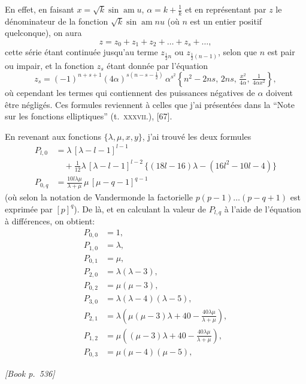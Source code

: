 \documentclass[11pt]{article}
\begin{document}
\noindent En effet, en faisant $x = \sqrt{k}\sin\operatorname{am} u$, $\alpha = k + \tfrac{1}{k}$ et en repr\'esentant par $z$ le d\'enominateur de la fonction $\sqrt{k}\sin\operatorname{am} nu$ (o\`u $n$ est un entier positif quelconque), on aura
\[
z = z_{0} + z_{1} + z_{2} + \dots + z_{s} + \dots ,
\]
cette s\'erie \'etant continu\'ee jusqu'au terme $z_{\frac{1}{2}n}$ ou $z_{\frac{1}{2}(n-1)}$, selon que $n$ est pair ou impair, et la fonction $z_{s}$ \'etant donn\'ee par l'\'equation
\[
z_{s} = (-1)^{n+s+1}(4\alpha)^{s(n-s-\frac{1}{2})}\,\alpha^{s^{2}}\left\{n^{2} - 2ns,\,2ns,\,\tfrac{x^{2}}{4\alpha},\,\tfrac{1}{4\alpha x^{2}}\right\},
\]
o\`u cependant les termes qui contiennent des puissances n\'egatives de $\alpha$ doivent \^etre n\'eglig\'es. Ces formules reviennent \`a celles que j'ai pr\'esent\'ees dans la ``Note sur les fonctions elliptiques'' (t.~\textsc{xxxvii}.), [67].

En revenant aux fonctions $\{\lambda,\mu,x,y\}$, j'ai trouv\'e les deux formules
\[
\begin{aligned}
P_{l,0} &= \lambda\,[\lambda - l - 1]^{l-1}\\
&\quad + \tfrac{1}{12}\lambda\,[\lambda - l - 1]^{l-2}\,\{(18l-16)\lambda - (16l^{2} - 10l - 4)\}\\
P_{0,q} &= \tfrac{10l\lambda\mu}{\lambda + \mu}\,\mu\,[\mu - q - 1]^{q-1}
\end{aligned}
\]
(o\`u selon la notation de Vandermonde la factorielle $p(p-1)\dots(p-q+1)$ est exprim\'ee par $[p]^{q}$). De l\`a, et en calculant la valeur de $P_{l,q}$ \`a l'aide de l'\'equation \`a diff\'erences, on obtient:
\[
\begin{aligned}
P_{0,0} &= 1,\\
P_{1,0} &= \lambda,\\
P_{0,1} &= \mu,\\
P_{2,0} &= \lambda(\lambda - 3),\\
P_{0,2} &= \mu(\mu - 3),\\
P_{3,0} &= \lambda(\lambda - 4)(\lambda - 5),\\
P_{2,1} &= \lambda\left(\mu(\mu - 3)\lambda + 40 - \tfrac{40\lambda\mu}{\lambda+\mu}\right),\\
P_{1,2} &= \mu\left((\mu - 3)\lambda + 40 - \tfrac{40\lambda\mu}{\lambda+\mu}\right),\\
P_{0,3} &= \mu(\mu - 4)(\mu - 5),
\end{aligned}
\]

\medskip
\noindent\textit{[Book p.~536]}\hfill

\smallskip
\end{document}
